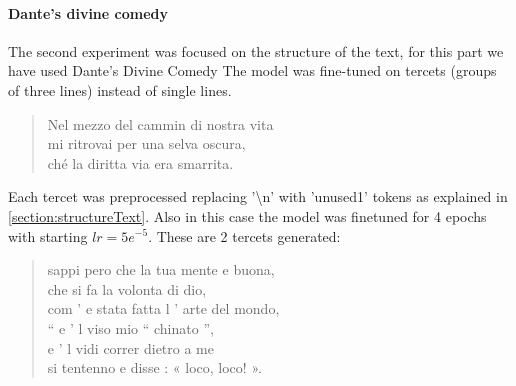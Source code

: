\documentclass[10pt,twocolumn,letterpaper]{article}
\begin{document}
\paragraph{Dante's divine comedy} The second experiment was focused on the structure of the text,
for this part we have used Dante's Divine Comedy
The model was fine-tuned on tercets (groups of three lines) instead of single lines.
\begin{quote}
   Nel mezzo del cammin di nostra vita\\
   mi ritrovai per una selva oscura,\\
   ché la diritta via era smarrita.\\
\end{quote}
Each tercet was preprocessed replacing '\textbackslash n' with 'unused1' tokens as explained in \ref{section:structureText}.
Also in this case the model was finetuned for 4 epochs with starting $lr=5e^{-5}$. These are 2 tercets generated:

\begin{quote}
%
%
sappi pero che la tua mente e buona,\\
che si fa la volonta di dio,\\
com ’ e stata fatta l ’ arte del mondo,\\

“ e ’ l viso mio “ chinato ”,\\
e ’ l vidi correr dietro a me\\
si tentenno e disse : « loco, loco! ».\\
%
\end{quote}
\end{document}
